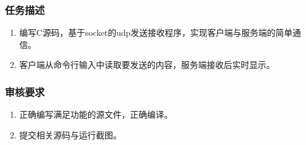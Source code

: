 \documentclass{article}
\begin{document}
\subsubsection{任务描述}
\begin{enumerate}
	\item 编写C源码，基于socket的udp发送接收程序，实现客户端与服务端的简单通信。
	\item 客户端从命令行输入中读取要发送的内容，服务端接收后实时显示。
\end{enumerate}

\subsubsection{审核要求}
\begin{enumerate}
	\item 正确编写满足功能的源文件，正确编译。
	\item 提交相关源码与运行截图。
\end{enumerate}
\end{document}
